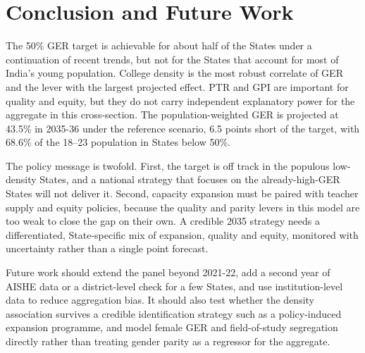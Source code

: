 \section{Conclusion and Future Work}\label{sec:conclusion}

The 50\% GER target is achievable for about half of the States under a continuation of recent trends, but not for the States that account for most of India's young population. College density is the most robust correlate of GER and the lever with the largest projected effect. PTR and GPI are important for quality and equity, but they do not carry independent explanatory power for the aggregate in this cross-section. The population-weighted GER is projected at 43.5\% in 2035-36 under the reference scenario, 6.5 points short of the target, with 68.6\% of the 18--23 population in States below 50\%.

The policy message is twofold. First, the target is off track in the populous low-density States, and a national strategy that focuses on the already-high-GER States will not deliver it. Second, capacity expansion must be paired with teacher supply and equity policies, because the quality and parity levers in this model are too weak to close the gap on their own. A credible 2035 strategy needs a differentiated, State-specific mix of expansion, quality and equity, monitored with uncertainty rather than a single point forecast.

Future work should extend the panel beyond 2021-22, add a second year of AISHE data or a district-level check for a few States, and use institution-level data to reduce aggregation bias. It should also test whether the density association survives a credible identification strategy such as a policy-induced expansion programme, and model female GER and field-of-study segregation directly rather than treating gender parity as a regressor for the aggregate.
